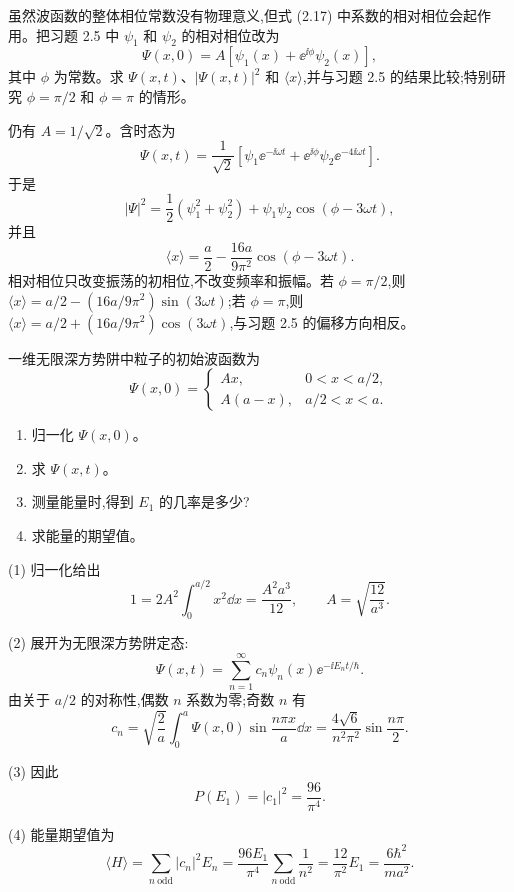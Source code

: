 \begin{question}
虽然波函数的整体相位常数没有物理意义,但式 (2.17) 中系数的相对相位会起作用。把习题 2.5 中 $\psi_1$ 和 $\psi_2$ 的相对相位改为
\[
\Psi(x,0)=A[\psi_1(x)+\ee^{\ii\phi}\psi_2(x)],
\]
其中 $\phi$ 为常数。求 $\Psi(x,t)$、$|\Psi(x,t)|^2$ 和 $\langle x\rangle$,并与习题 2.5 的结果比较;特别研究 $\phi=\pi/2$ 和 $\phi=\pi$ 的情形。

\par\smallskip
{}

\begin{solution}
仍有 $A=1/\sqrt2$。含时态为
\[
\Psi(x,t)=\frac1{\sqrt2}\left[\psi_1\ee^{-\ii\omega t}+\ee^{\ii\phi}\psi_2\ee^{-4\ii\omega t}\right].
\]
于是
\[
|\Psi|^2=\frac12(\psi_1^2+\psi_2^2)+\psi_1\psi_2\cos(\phi-3\omega t),
\]
并且
\[
\langle x\rangle=\frac a2-\frac{16a}{9\pi^2}\cos(\phi-3\omega t).
\]
相对相位只改变振荡的初相位,不改变频率和振幅。若 $\phi=\pi/2$,则 $\langle x\rangle=a/2-(16a/9\pi^2)\sin(3\omega t)$;若 $\phi=\pi$,则 $\langle x\rangle=a/2+(16a/9\pi^2)\cos(3\omega t)$,与习题 2.5 的偏移方向相反。
\end{solution}
\end{question}

\begin{question}
一维无限深方势阱中粒子的初始波函数为
\[
\Psi(x,0)=
\begin{cases}
Ax, & 0<x<a/2,\\
A(a-x), & a/2<x<a.
\end{cases}
\]
\begin{enumerate}
\item 归一化 $\Psi(x,0)$。
\item 求 $\Psi(x,t)$。
\item 测量能量时,得到 $E_1$ 的几率是多少?
\item 求能量的期望值。
\end{enumerate}
\begin{solution}
(1) 归一化给出
\[
1=2A^2\int_0^{a/2}x^2\dd x=\frac{A^2a^3}{12},
\qquad
A=\sqrt{\frac{12}{a^3}}.
\]

(2) 展开为无限深方势阱定态:
\[
\Psi(x,t)=\sum_{n=1}^{\infty}c_n\psi_n(x)\ee^{-\ii E_nt/\hbar}.
\]
由关于 $a/2$ 的对称性,偶数 $n$ 系数为零;奇数 $n$ 有
\[
 c_n=\sqrt{\frac2a}\int_0^a\Psi(x,0)\sin\frac{n\pi x}{a}\dd x
 =\frac{4\sqrt6}{n^2\pi^2}\sin\frac{n\pi}{2}.
\]

(3) 因此
\[
P(E_1)=|c_1|^2=\frac{96}{\pi^4}.
\]

(4) 能量期望值为
\[
\langle H\rangle=\sum_{n\ \mathrm{odd}}|c_n|^2E_n
=\frac{96E_1}{\pi^4}\sum_{n\ \mathrm{odd}}\frac1{n^2}
=\frac{12}{\pi^2}E_1
=\frac{6\hbar^2}{ma^2}.
\]
\end{solution}
\end{question}

